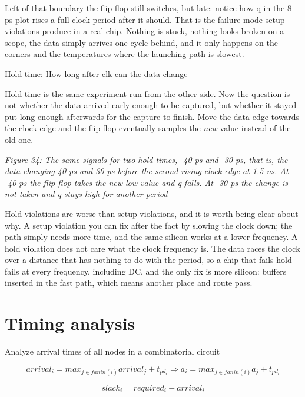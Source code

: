 Left of that boundary the flip-flop still switches, but late: notice how
q in the 8 ps plot rises a full clock period after it should. That is
the failure mode setup violations produce in a real chip. Nothing is
stuck, nothing looks broken on a scope, the data simply arrives one
cycle behind, and it only happens on the corners and the temperatures
where the launching path is slowest.

Hold time: How long after clk can the data change

Hold time is the same experiment run from the other side. Now the
question is not whether the data arrived early enough to be captured,
but whether it stayed put long enough afterwards for the capture to
finish. Move the data edge towards the clock edge and the flip-flop
eventually samples the \emph{new} value instead of the old one.


{
\centering
{}
}


{
\centering
{}
}

\emph{Figure 34: The same signals for two hold times, -40 ps and -30 ps,
that is, the data changing 40 ps and 30 ps before the second rising
clock edge at 1.5 ns. At -40 ps the flip-flop takes the new low value
and q falls. At -30 ps the change is not taken and q stays high for
another period}

Hold violations are worse than setup violations, and it is worth being
clear about why. A setup violation you can fix after the fact by slowing
the clock down; the path simply needs more time, and the same silicon
works at a lower frequency. A hold violation does not care what the
clock frequency is. The data races the clock over a distance that has
nothing to do with the period, so a chip that fails hold fails at every
frequency, including DC, and the only fix is more silicon: buffers
inserted in the fast path, which means another place and route pass.

\section{Timing analysis}\label{timing-analysis}

Analyze arrival times of all nodes in a combinatorial circuit

\[ arrival_i = max_{j \in fanin(i)}{arrival_j} + t_{pd_i} \Rightarrow  a_i = max_{j \in fanin(i)}{a_j} + t_{pd_i}\]

\[ slack_i = required_i - arrival_i\]

